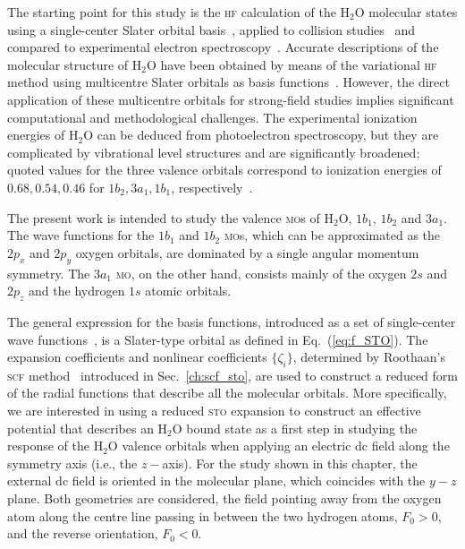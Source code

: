 The starting point for this study is the \textsc{hf} calculation of
the H$_{2}$O molecular states using a single-center Slater orbital
basis~\cite{Moccia_1964,Moccia_JCP_2164,Moccia_JCP_2176}, applied to
collision studies~\cite{Montanari_2013} and compared to experimental
electron spectroscopy~\cite{Hafied_2007}. Accurate descriptions of the
molecular structure of H$_{2}$O have been obtained by means of the
variational \textsc{hf} method using multicentre Slater orbitals as
basis functions~\cite{Pitzer_1968,Pitzer_1970}. However, the direct
application of these multicentre orbitals for strong-field studies
implies significant computational and methodological challenges.
The experimental ionization energies of H$_{2}$O can be deduced from
photoelectron spectroscopy, but they are complicated by vibrational
level structures and are significantly broadened; quoted values for
the three valence orbitals correspond to ionization energies of $0.68,
0.54, 0.46$ for $1b_{2}, 3a_{1}, 1b_{1}$,
respectively~\cite{2020Photoelectron}.

The present work is intended to study the valence \textsc{mo}s
of H$_{2}$O, $1b_{1}$, $1b_{2}$ and $3a_{1}$. The wave functions for
the $1b_{1}$ and $1b_{2}$ \textsc{mo}s, which can be approximated as
the $2p_{x}$ and $2p_{y}$ oxygen orbitals, are dominated by a single
angular momentum symmetry. The $3a_{1}$ \textsc{mo}, on the other
hand, consists mainly of the oxygen $2s$ and $2p_{z}$ and the hydrogen
$1s$ atomic orbitals.

The general expression for the basis functions, introduced as a set of
single-center wave
functions~\cite{Moccia_1964,Moccia_JCP_2164,Moccia_JCP_2176}, is a
Slater-type orbital as defined in Eq.~(\ref{eq:f_STO}). The expansion
coefficients and nonlinear coefficients $\{\zeta_{i}\}$, determined by
Roothaan's \textsc{scf} method~\cite{Moccia_1964,Roothaan_HF}
introduced in Sec.~\ref{ch:scf_sto}, are used to construct a reduced
form of the radial functions that describe all the molecular
orbitals. More specifically, we are interested in using a reduced
\textsc{sto} expansion to construct an effective potential that
describes an H$_{2}$O bound state as a first step in studying the
response of the H$_{2}$O valence orbitals when applying an electric dc
field along the symmetry axis (i.e., the $z-$axis). For the study
shown in this chapter, the external dc field is oriented in the
molecular plane, which coincides with the $y-z$ plane. Both geometries
are considered, the field pointing away from the oxygen atom along the
centre line passing in between the two hydrogen atoms, $F_{0} > 0$,
and the reverse orientation, $F_{0} < 0$.

